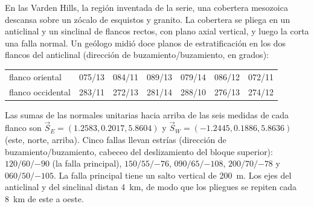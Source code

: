 \begin{problem}
\label{pb:b3:structural-analysis:1}
En las Varden Hills, la región inventada de la serie, una cobertera mesozoica descansa sobre un
zócalo de esquistos y granito. La cobertera se pliega en un anticlinal
y un sinclinal de flancos rectos, con plano axial vertical, y luego la corta una falla normal. Un
geólogo midió doce planos de estratificación en los dos flancos del anticlinal
(dirección de buzamiento/buzamiento, en grados):

\begin{center}
\small
\begin{tabular}{l|cccccc}
\hline
flanco oriental & 075/13 & 084/11 & 089/13 & 079/14 & 086/12 & 072/11 \\
flanco occidental & 283/11 & 272/13 & 281/14 & 288/10 & 276/13 & 274/12 \\
\hline
\end{tabular}
\end{center}

Las sumas de las normales unitarias hacia arriba de las seis medidas de cada flanco son
$\vec S_E = (1.2583, 0.2017, 5.8604)$ y $\vec S_W = (-1.2445, 0.1886,
5.8636)$ (este, norte, arriba). Cinco fallas llevan estrías (dirección de buzamiento/buzamiento,
cabeceo del deslizamiento del bloque superior): $120/60/{-90}$ (la falla principal), $150/55/{-76}$,
$090/65/{-108}$, $200/70/{-78}$ y $060/50/{-105}$. La falla principal tiene un
salto vertical de \qty{200}{m}. Los ejes del anticlinal y del sinclinal distan \qty{4}{km},
de modo que los pliegues se repiten cada \qty{8}{km} de este a oeste.


\end{problem}
